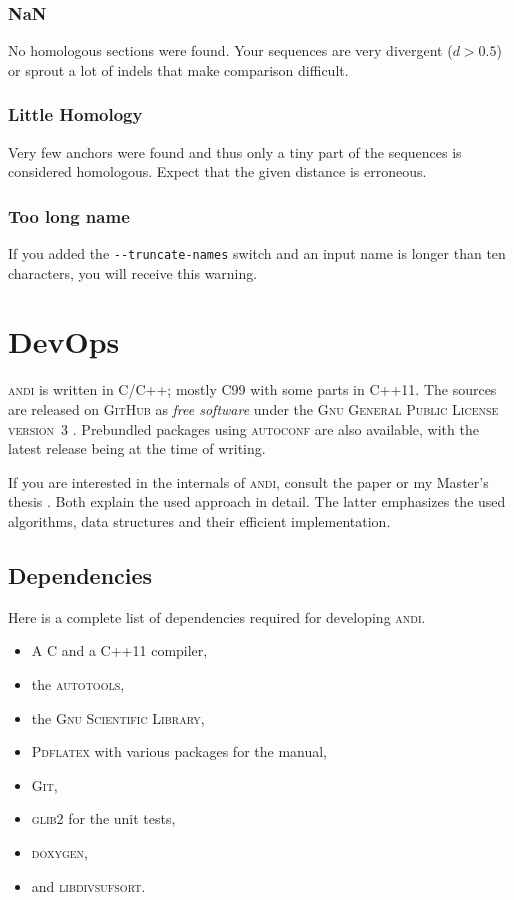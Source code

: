 \documentclass[a4paper,
  10pt,
  english,
  DIV=12,
  BCOR=8mm]{scrbook}
\newcommand{\algo}[1]{\textsc{{#1}}}
\newcommand{\andi}{\algo{andi}\xspace}
\begin{document}
\subsection*{NaN}

No homologous sections were found. Your sequences are very divergent ($d>0.5$) or sprout a lot of indels that make comparison difficult.

\subsection*{Little Homology}

Very few anchors were found and thus only a tiny part of the sequences is considered homologous. Expect that the given distance is erroneous.

\subsection*{Too long name}

If you added the \lstinline$--truncate-names$ switch and an input name is longer than ten characters, you will receive this warning.

\chapter{DevOps} %

\andi is written in C/C++; mostly C99 with some parts in C++11. The sources are released on \algo{GitHub} as \emph{free software} under the \textsc{Gnu General Public License version~3} \cite{GPL}. Prebundled packages using \algo{autoconf} are also available, with the latest release being {\version} at the time of writing.

If you are interested in the internals of \algo{andi}, consult the paper \cite{andi} or my Master's thesis \cite{kloetzl}. Both explain the used approach in detail. The latter emphasizes the used algorithms, data structures and their efficient implementation.

\section{Dependencies}

Here is a complete list of dependencies required for developing \algo{andi}.

\begin{itemize}
  \item A C and a C++11 compiler,
  \item the \algo{autotools},
  \item the \algo{Gnu Scientific Library},
  \item \algo{Pdflatex} with various packages for the manual,
  \item \algo{Git},
  \item \algo{glib2} for the unit tests,
  \item \algo{doxygen},
  \item and \algo{libdivsufsort}.
\end{itemize}
\end{document}
